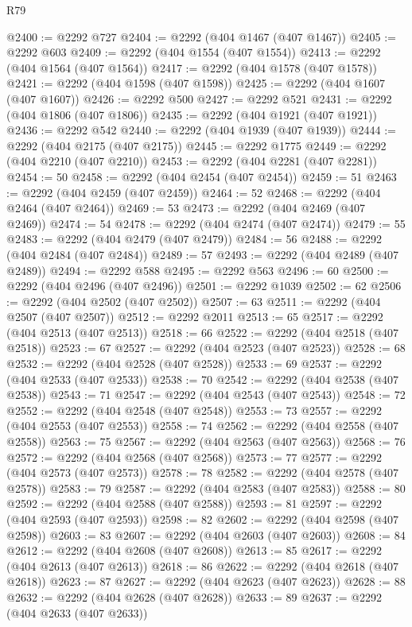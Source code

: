 \begin{lexlean}{R79}
\begin{coremodule}
@2400 := @2292 @727
@2404 := @2292 (@404 @1467 (@407 @1467))
@2405 := @2292 @603
@2409 := @2292 (@404 @1554 (@407 @1554))
@2413 := @2292 (@404 @1564 (@407 @1564))
@2417 := @2292 (@404 @1578 (@407 @1578))
@2421 := @2292 (@404 @1598 (@407 @1598))
@2425 := @2292 (@404 @1607 (@407 @1607))
@2426 := @2292 @500
@2427 := @2292 @521
@2431 := @2292 (@404 @1806 (@407 @1806))
@2435 := @2292 (@404 @1921 (@407 @1921))
@2436 := @2292 @542
@2440 := @2292 (@404 @1939 (@407 @1939))
@2444 := @2292 (@404 @2175 (@407 @2175))
@2445 := @2292 @1775
@2449 := @2292 (@404 @2210 (@407 @2210))
@2453 := @2292 (@404 @2281 (@407 @2281))
@2454 := 50
@2458 := @2292 (@404 @2454 (@407 @2454))
@2459 := 51
@2463 := @2292 (@404 @2459 (@407 @2459))
@2464 := 52
@2468 := @2292 (@404 @2464 (@407 @2464))
@2469 := 53
@2473 := @2292 (@404 @2469 (@407 @2469))
@2474 := 54
@2478 := @2292 (@404 @2474 (@407 @2474))
@2479 := 55
@2483 := @2292 (@404 @2479 (@407 @2479))
@2484 := 56
@2488 := @2292 (@404 @2484 (@407 @2484))
@2489 := 57
@2493 := @2292 (@404 @2489 (@407 @2489))
@2494 := @2292 @588
@2495 := @2292 @563
@2496 := 60
@2500 := @2292 (@404 @2496 (@407 @2496))
@2501 := @2292 @1039
@2502 := 62
@2506 := @2292 (@404 @2502 (@407 @2502))
@2507 := 63
@2511 := @2292 (@404 @2507 (@407 @2507))
@2512 := @2292 @2011
@2513 := 65
@2517 := @2292 (@404 @2513 (@407 @2513))
@2518 := 66
@2522 := @2292 (@404 @2518 (@407 @2518))
@2523 := 67
@2527 := @2292 (@404 @2523 (@407 @2523))
@2528 := 68
@2532 := @2292 (@404 @2528 (@407 @2528))
@2533 := 69
@2537 := @2292 (@404 @2533 (@407 @2533))
@2538 := 70
@2542 := @2292 (@404 @2538 (@407 @2538))
@2543 := 71
@2547 := @2292 (@404 @2543 (@407 @2543))
@2548 := 72
@2552 := @2292 (@404 @2548 (@407 @2548))
@2553 := 73
@2557 := @2292 (@404 @2553 (@407 @2553))
@2558 := 74
@2562 := @2292 (@404 @2558 (@407 @2558))
@2563 := 75
@2567 := @2292 (@404 @2563 (@407 @2563))
@2568 := 76
@2572 := @2292 (@404 @2568 (@407 @2568))
@2573 := 77
@2577 := @2292 (@404 @2573 (@407 @2573))
@2578 := 78
@2582 := @2292 (@404 @2578 (@407 @2578))
@2583 := 79
@2587 := @2292 (@404 @2583 (@407 @2583))
@2588 := 80
@2592 := @2292 (@404 @2588 (@407 @2588))
@2593 := 81
@2597 := @2292 (@404 @2593 (@407 @2593))
@2598 := 82
@2602 := @2292 (@404 @2598 (@407 @2598))
@2603 := 83
@2607 := @2292 (@404 @2603 (@407 @2603))
@2608 := 84
@2612 := @2292 (@404 @2608 (@407 @2608))
@2613 := 85
@2617 := @2292 (@404 @2613 (@407 @2613))
@2618 := 86
@2622 := @2292 (@404 @2618 (@407 @2618))
@2623 := 87
@2627 := @2292 (@404 @2623 (@407 @2623))
@2628 := 88
@2632 := @2292 (@404 @2628 (@407 @2628))
@2633 := 89
@2637 := @2292 (@404 @2633 (@407 @2633))

\end{coremodule}
\end{lexlean}
